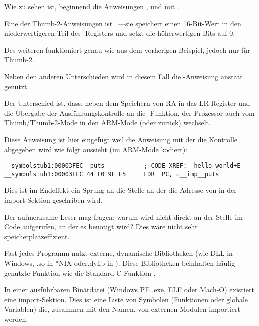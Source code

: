 
Wie zu sehen ist, beginnend die Anweisungen ,  und  mit .

Eine der Thumb-2-Anweisungen ist  ~---sie speichert einen 16-Bit-Wert in den
niederwertigeren Teil des -Registers und setzt die höherwertigen Bits auf 0.

Des weiteren funktioniert  genau wie  aus dem vorherigen Beispiel,
jedoch nur für Thumb-2.


Neben den anderen Unterschieden wird in diesem Fall die -Anweisung anstatt  genutzt.

Der Unterschied ist, dass, neben dem Speichern von \ac{RA} in das \ac{LR}-Register und die Übergabe
der Ausführungskontrolle an die \puts-Funktion, der Prozessor auch vom Thumb/Thumb-2-Mode in den
ARM-Mode (oder zurück) wechselt.

Diese Anweisung ist hier eingefügt weil die Anweisung mit der die Kontrolle abgegeben wird wie folgt
aussieht (im ARM-Mode kodiert):

\begin{lstlisting}[style=customasmARM]
__symbolstub1:00003FEC _puts           ; CODE XREF: _hello_world+E
__symbolstub1:00003FEC 44 F0 9F E5     LDR  PC, =__imp__puts
\end{lstlisting}

Dies ist im Endeffekt ein Sprung an die Stelle an der die Adresse von \puts in der import-Sektion geschriben wird.

Der aufmerksame Leser mag fragen: warum wird \puts nicht direkt an der Stelle im Code aufgerufen,
an der es benötigt wird? Dies wäre nicht sehr speicherplatzeffizient.

Fast jedes Programm nutzt externe, dynamische Bibliotheken (wie DLL in Windows, .so in *NIX oder.dylib in \MacOSX).
Diese Bibliotheken beinhalten häufig genutzte Funktion wie die Standard-C-Funktion \puts.

In einer ausführbaren Binärdatei (Windows PE .exe, ELF oder Mach-O) existiert eine import-Sektion.
Dies ist eine Liste von Symbolen (Funktionen oder globale Variablen) die, zusammen mit den Namen, von
externen Modulen importiert werden.

